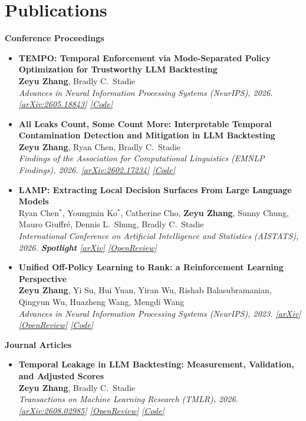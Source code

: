 \documentclass[10.5pt]{article}
\newcommand{\pub}[4]{%
  \item[{[#1]}] \textbf{#2}\\
  {\small #3}\\
  {\small\itshape #4}}
\newenvironment{publist}
  {\begin{itemize}[leftmargin=2.5em, topsep=2pt, itemsep=5pt, parsep=0pt]}
  {\end{itemize}}
\newcommand{\me}{\textbf{Zeyu Zhang}}
\begin{document}
\section{Publications}

\textbf{Conference Proceedings}
\begin{publist}
  \pub{C1}{TEMPO: Temporal Enforcement via Mode-Separated Policy Optimization for Trustworthy LLM Backtesting}
    {\me, Bradly C.\ Stadie}
    {Advances in Neural Information Processing Systems (NeurIPS), 2026. \;
     {\upshape\small\href{https://arxiv.org/abs/2605.18843}{[arXiv:2605.18843]}
     \href{https://github.com/nu-snail/TEMPO}{[Code]}}}
  \pub{C2}{All Leaks Count, Some Count More: Interpretable Temporal Contamination Detection and Mitigation in LLM Backtesting}
    {\me, Ryan Chen, Bradly C.\ Stadie}
    {Findings of the Association for Computational Linguistics (EMNLP Findings), 2026. \;
     {\upshape\small\href{https://arxiv.org/abs/2602.17234}{[arXiv:2602.17234]}
     \href{https://github.com/ZeyuZhang1901/TimeSPEC}{[Code]}}}
  \pub{C3}{LAMP: Extracting Local Decision Surfaces From Large Language Models}
    {Ryan Chen$^*$, Youngmin Ko$^*$, Catherine Cho, \me, Sunny Chung, Mauro Giuffr\'e, Dennis L.\ Shung, Bradly C.\ Stadie}
    {International Conference on Artificial Intelligence and Statistics (AISTATS), 2026.
     \textbf{\textcolor{accent}{Spotlight}} \;
     {\upshape\small\href{https://arxiv.org/abs/2505.11772}{[arXiv]}
     \href{https://openreview.net/forum?id=mynHcPXsMv}{[OpenReview]}}}
  \pub{C4}{Unified Off-Policy Learning to Rank: a Reinforcement Learning Perspective}
    {\me, Yi Su, Hui Yuan, Yiran Wu, Rishab Balasubramanian, Qingyun Wu, Huazheng Wang, Mengdi Wang}
    {Advances in Neural Information Processing Systems (NeurIPS), 2023. \;
     {\upshape\small\href{https://arxiv.org/abs/2306.07528}{[arXiv]}
     \href{https://openreview.net/forum?id=oDcWnfZyZW}{[OpenReview]}
     \href{https://github.com/ZeyuZhang1901/Unified-Off-Policy-LTR-Neurips2023}{[Code]}}}
\end{publist}

\vspace{5pt}
\textbf{Journal Articles}
\begin{publist}
  \pub{J1}{Temporal Leakage in LLM Backtesting: Measurement, Validation, and Adjusted Scores}
    {\me, Bradly C.\ Stadie}
    {Transactions on Machine Learning Research (TMLR), 2026. \;
     {\upshape\small\href{https://arxiv.org/abs/2608.02985}{[arXiv:2608.02985]}
     \href{https://openreview.net/forum?id=x3qagPELrp}{[OpenReview]}
     \href{https://github.com/ZeyuZhang1901/Temporal-Leakage-Backtesting}{[Code]}}}
\end{publist}
\end{document}
